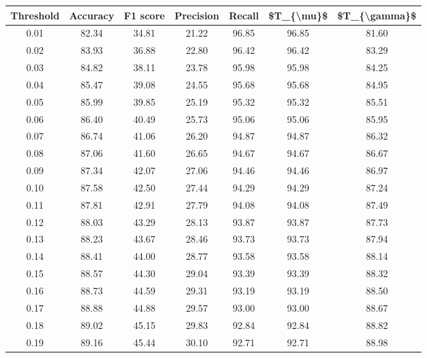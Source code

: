 \begin{tabular}{|c|c|c|c|c|c|c|}
\hline
 Threshold &  Accuracy &  F1 score &  Precision &  Recall &  \$T\_\{\textbackslash mu\}\$ &  \$T\_\{\textbackslash gamma\}\$ \\
\hline
      0.01 &     82.34 &     34.81 &      21.22 &   96.85 &      96.85 &         81.60 \\
      0.02 &     83.93 &     36.88 &      22.80 &   96.42 &      96.42 &         83.29 \\
      0.03 &     84.82 &     38.11 &      23.78 &   95.98 &      95.98 &         84.25 \\
      0.04 &     85.47 &     39.08 &      24.55 &   95.68 &      95.68 &         84.95 \\
      0.05 &     85.99 &     39.85 &      25.19 &   95.32 &      95.32 &         85.51 \\
      0.06 &     86.40 &     40.49 &      25.73 &   95.06 &      95.06 &         85.95 \\
      0.07 &     86.74 &     41.06 &      26.20 &   94.87 &      94.87 &         86.32 \\
      0.08 &     87.06 &     41.60 &      26.65 &   94.67 &      94.67 &         86.67 \\
      0.09 &     87.34 &     42.07 &      27.06 &   94.46 &      94.46 &         86.97 \\
      0.10 &     87.58 &     42.50 &      27.44 &   94.29 &      94.29 &         87.24 \\
      0.11 &     87.81 &     42.91 &      27.79 &   94.08 &      94.08 &         87.49 \\
      0.12 &     88.03 &     43.29 &      28.13 &   93.87 &      93.87 &         87.73 \\
      0.13 &     88.23 &     43.67 &      28.46 &   93.73 &      93.73 &         87.94 \\
      0.14 &     88.41 &     44.00 &      28.77 &   93.58 &      93.58 &         88.14 \\
      0.15 &     88.57 &     44.30 &      29.04 &   93.39 &      93.39 &         88.32 \\
      0.16 &     88.73 &     44.59 &      29.31 &   93.19 &      93.19 &         88.50 \\
      0.17 &     88.88 &     44.88 &      29.57 &   93.00 &      93.00 &         88.67 \\
      0.18 &     89.02 &     45.15 &      29.83 &   92.84 &      92.84 &         88.82 \\
      0.19 &     89.16 &     45.44 &      30.10 &   92.71 &      92.71 &         88.98 \\

\end{tabular}
